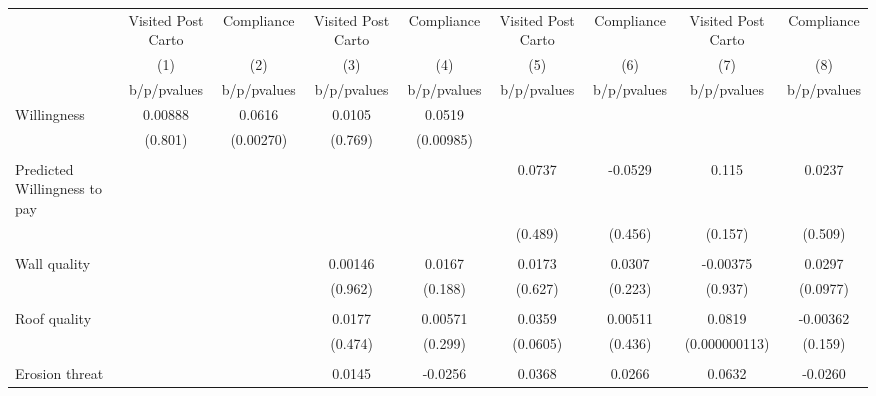 {
\def\sym#1{\ifmmode^{#1}\else\(^{#1}\)\fi}
\begin{tabular}{l*{8}{c}}
\toprule
                &\multicolumn{1}{c}{Visited Post Carto}&\multicolumn{1}{c}{Compliance}&\multicolumn{1}{c}{Visited Post Carto}&\multicolumn{1}{c}{Compliance}&\multicolumn{1}{c}{Visited Post Carto}&\multicolumn{1}{c}{Compliance}&\multicolumn{1}{c}{Visited Post Carto}&\multicolumn{1}{c}{Compliance}\\
                &\multicolumn{1}{c}{(1)}&\multicolumn{1}{c}{(2)}&\multicolumn{1}{c}{(3)}&\multicolumn{1}{c}{(4)}&\multicolumn{1}{c}{(5)}&\multicolumn{1}{c}{(6)}&\multicolumn{1}{c}{(7)}&\multicolumn{1}{c}{(8)}\\
                &b/p/pvalues&b/p/pvalues&b/p/pvalues&b/p/pvalues&b/p/pvalues&b/p/pvalues&b/p/pvalues&b/p/pvalues\\
\midrule
Willingness     &  0.00888&   0.0616&   0.0105&   0.0519&         &         &         &         \\
                &  (0.801)&(0.00270)&  (0.769)&(0.00985)&         &         &         &         \\
                &         &         &         &         &         &         &         &         \\
Predicted Willingness to pay&         &         &         &         &   0.0737&  -0.0529&    0.115&   0.0237\\
                &         &         &         &         &  (0.489)&  (0.456)&  (0.157)&  (0.509)\\
                &         &         &         &         &         &         &         &         \\
Wall quality    &         &         &  0.00146&   0.0167&   0.0173&   0.0307& -0.00375&   0.0297\\
                &         &         &  (0.962)&  (0.188)&  (0.627)&  (0.223)&  (0.937)& (0.0977)\\
                &         &         &         &         &         &         &         &         \\
Roof quality    &         &         &   0.0177&  0.00571&   0.0359&  0.00511&   0.0819& -0.00362\\
                &         &         &  (0.474)&  (0.299)& (0.0605)&  (0.436)&(0.000000113)&  (0.159)\\
                &         &         &         &         &         &         &         &         \\
Erosion threat  &         &         &   0.0145&  -0.0256&   0.0368&   0.0266&   0.0632&  -0.0260\\

\end{tabular}}
